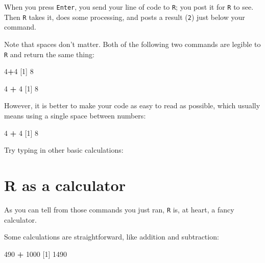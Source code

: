 \documentclass[
]{book}
\newenvironment{Shaded}{\begin{snugshade}}{\end{snugshade}}
\newcommand{\DecValTok}[1]{\textcolor[rgb]{0.00,0.00,0.81}{#1}}
\newcommand{\NormalTok}[1]{#1}
\newcommand{\SpecialCharTok}[1]{\textcolor[rgb]{0.81,0.36,0.00}{\textbf{#1}}}
\begin{document}
When you press \texttt{Enter}, you send your line of code to \texttt{R}; you post it for \texttt{R} to see. Then \texttt{R} takes it, does some processing, and posts a result (\texttt{2}) just below your command.

Note that spaces don't matter. Both of the following two commands are legible to \texttt{R} and return the same thing:

\begin{Shaded}
\begin{Highlighting}[]
\DecValTok{4}\SpecialCharTok{+}\DecValTok{4}
\NormalTok{[}\DecValTok{1}\NormalTok{] }\DecValTok{8}
\end{Highlighting}
\end{Shaded}

\begin{Shaded}
\begin{Highlighting}[]
\DecValTok{4}        \SpecialCharTok{+}        \DecValTok{4}
\NormalTok{[}\DecValTok{1}\NormalTok{] }\DecValTok{8}
\end{Highlighting}
\end{Shaded}

However, it is better to make your code as easy to read as possible, which usually means using a single space between numbers:

\begin{Shaded}
\begin{Highlighting}[]
\DecValTok{4} \SpecialCharTok{+} \DecValTok{4}
\NormalTok{[}\DecValTok{1}\NormalTok{] }\DecValTok{8}
\end{Highlighting}
\end{Shaded}

Try typing in other basic calculations:

\section*{R as a calculator}\label{r-as-a-calculator}

As you can tell from those commands you just ran, \texttt{R} is, at heart, a fancy calculator.

Some calculations are straightforward, like addition and subtraction:

\begin{Shaded}
\begin{Highlighting}[]
\DecValTok{490} \SpecialCharTok{+} \DecValTok{1000}
\NormalTok{[}\DecValTok{1}\NormalTok{] }\DecValTok{1490}
\end{Highlighting}
\end{Shaded}
\end{document}
